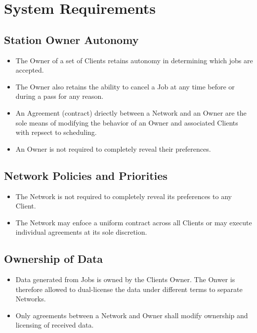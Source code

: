 \documentclass{article}
\begin{document}
\section{System Requirements}

\subsection{Station Owner Autonomy}

\begin{itemize}
	\item The Owner of a set of Clients retains autonomy in determining which jobs are accepted.
	\item The Owner also retains the ability to cancel a Job at any time before or during a pass for any reason.
	\item An Agreement (contract) driectly between a Network and an Owner are the sole means of modifying the behavior of an Owner and associated Clients with repsect to scheduling.
	\item An Owner is not required to completely reveal their preferences.
\end{itemize}

\subsection{Network Policies and Priorities}

\begin{itemize}
	\item The Network is not required to completely reveal its preferences to any Client.
	\item The Network may enfoce a uniform contract across all Clients or may execute individual agreements at its sole discretion.
\end{itemize}


\subsection{Ownership of Data}

\begin{itemize}
	\item Data generated from Jobs is owned by the Clients Owner. The Onwer is therefore allowed to dual-license the data under different terms to separate Networks.
	\item Only agreements between a Network and Owner shall modify ownership and licensing of received data.
\end{itemize}
\end{document}
